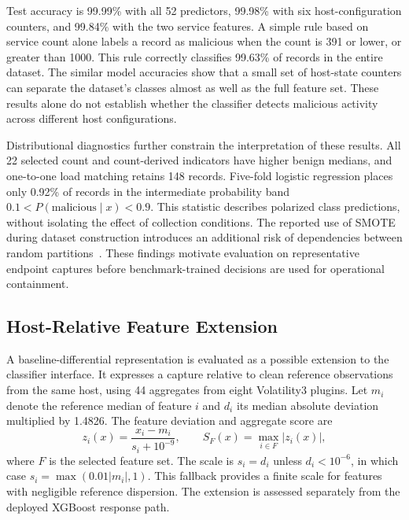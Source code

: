 \documentclass[conference]{IEEEtran}
\begin{document}
Test accuracy is 99.99\% with all 52 predictors, 99.98\% with six host-configuration counters, and 99.84\% with the two service features. A simple rule based on service count alone labels a record as malicious when the count is 391 or lower, or greater than 1000. This rule correctly classifies 99.63\% of records in the entire dataset.
The similar model accuracies show that a small set of host-state counters can separate the dataset's classes almost as well as the full feature set. These results alone do not establish whether the classifier detects malicious activity across different host configurations.

Distributional diagnostics further constrain the interpretation of these results. All 22 selected count and count-derived indicators have higher benign medians, and one-to-one load matching retains 148 records. Five-fold logistic regression places only 0.92\% of records in the intermediate probability band $0.1<P(\mathrm{malicious}\mid x)<0.9$. This statistic describes polarized class predictions, without isolating the effect of collection conditions. The reported use of SMOTE during dataset construction introduces an additional risk of dependencies between random partitions~\cite{carrier2022}. These findings motivate evaluation on representative endpoint captures before benchmark-trained decisions are used for operational containment.


\subsection{Host-Relative Feature Extension}
A baseline-differential representation is evaluated as a possible extension to the classifier interface. It expresses a capture relative to clean reference observations from the same host, using 44 aggregates from eight Volatility3 plugins. Let $m_i$ denote the reference median of feature $i$ and $d_i$ its median absolute deviation multiplied by 1.4826. The feature deviation and aggregate score are
\begin{equation}
z_i(x)=\frac{x_i-m_i}{s_i+10^{-9}},\qquad
S_F(x)=\max_{i\in F}|z_i(x)|,
\end{equation}
where $F$ is the selected feature set. The scale is $s_i=d_i$ unless $d_i<10^{-6}$, in which case $s_i=\max(0.01|m_i|,1)$. This fallback provides a finite scale for features with negligible reference dispersion. The extension is assessed separately from the deployed XGBoost response path.
\end{document}
